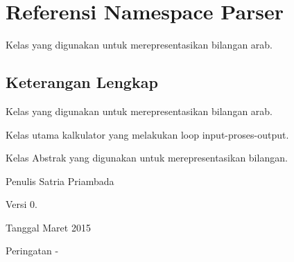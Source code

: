 \hypertarget{namespaceParser}{}\section{Referensi Namespace Parser}
\label{namespaceParser}


Kelas yang digunakan untuk merepresentasikan bilangan arab.  




\subsection{Keterangan Lengkap}
Kelas yang digunakan untuk merepresentasikan bilangan arab. 

Kelas utama kalkulator yang melakukan loop input-\/proses-\/output.

Kelas Abstrak yang digunakan untuk merepresentasikan bilangan.

\begin{DoxyAuthor}{Penulis}
Satria Priambada 
\end{DoxyAuthor}
\begin{DoxyVersion}{Versi}
0. 
\end{DoxyVersion}
\begin{DoxyDate}{Tanggal}
Maret 2015 
\end{DoxyDate}
\begin{DoxyWarning}{Peringatan}
-\/ 
\end{DoxyWarning}
